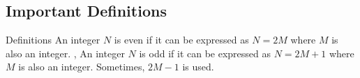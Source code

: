 \subsection{Important Definitions}
\begin{namedframe}{Definitions}
	An integer $N$ is even if it can be expressed as $N=2M$ where $M$ is also an integer.
	\sep
	An integer $N$ is odd if it can be expressed as $N=2M+1$ where $M$ is also an integer.
	\pause
	Sometimes, $2M-1$ is used.
\end{namedframe}
